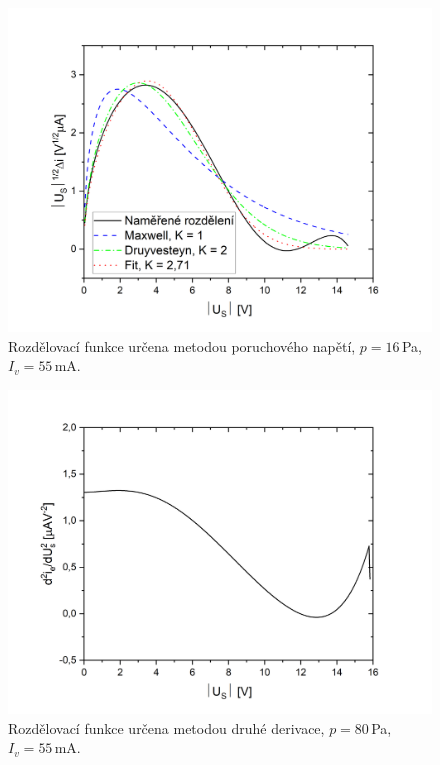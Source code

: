 \documentclass[a4paper,12pt]{article}
\begin{document}
\begin{figure}[h!]
	\centering
	\includegraphics[width=135mm]{rozdeleniG3.png}
	\caption{Rozdělovací funkce určena metodou poruchového napětí, 
	$p=16$\,\si{\pascal}, $I_v = 55$\,\si{\milli\ampere}.}
	\label{rozdeleniG3}
\end{figure}

\begin{figure}[h!]
	\centering
	\includegraphics[width=135mm]{rozdeleniD2G1.png}
	\caption{Rozdělovací funkce určena metodou druhé derivace, 
		$p=80$\,\si{\pascal}, $I_v = 55$\,\si{\milli\ampere}.}
	\label{rozdeleniD2G1}
\end{figure}
\end{document}
